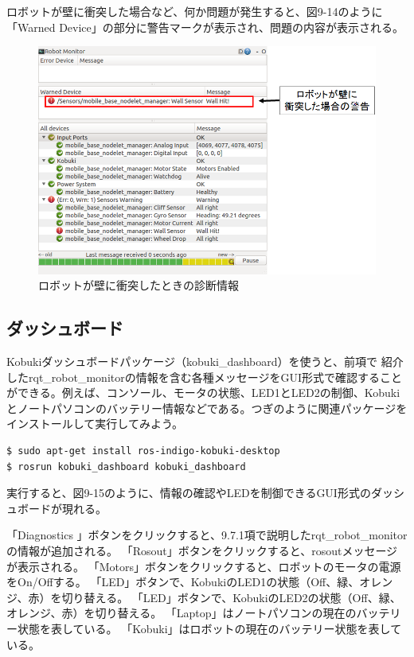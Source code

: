 \begin{itemize}
ロボットが壁に衝突した場合など、何か問題が発生すると、図9-14のように「Warned Device」の部分に警告マークが表示され、問題の内容が表示される。

\begin{figure}[htp]
  \centering
  \includegraphics[width=12cm]{pictures/chapter9/pic_09_14.png}
  \caption{ロボットが壁に衝突したときの診断情報}
\end{figure}

\subsection{ダッシュボード}

Kobukiダッシュボードパッケージ（kobuki\_dashboard）を使うと、前項で   紹介したrqt\_robot\_monitorの情報を含む各種メッセージをGUI形式で確認することができる。例えば、コンソール、モータの状態、LED1とLED2の制御、Kobukiとノートパソコンのバッテリー情報などである。つぎのように関連パッケージをインストールして実行してみよう。

\begin{lstlisting}[language=ROS]
$ sudo apt-get install ros-indigo-kobuki-desktop
$ rosrun kobuki_dashboard kobuki_dashboard
\end{lstlisting}

実行すると、図9-15のように、情報の確認やLEDを制御できるGUI形式のダッシュボードが現れる。

\setcounter{num}{0}
\circled{\thenum} 「Diagnostics   」ボタンをクリックすると、9.7.1項で説明したrqt\_robot\_monitor\\の情報が追加される。
\circled{\thenum}「Rosout」ボタンをクリックすると、rosoutメッセージが表示される。
\circled{\thenum}「Motors」ボタンをクリックすると、ロボットのモータの電源をOn/Offする。
\circled{\thenum}「LED」ボタンで、KobukiのLED1の状態（Off、緑、オレンジ、赤）を切り替える。
\circled{\thenum}「LED」ボタンで、KobukiのLED2の状態（Off、緑、オレンジ、赤）を切り替える。
\circled{\thenum}「Laptop」はノートパソコンの現在のバッテリー状態を表している。
\circled{\thenum}「Kobuki」はロボットの現在のバッテリー状態を表している。


\end{itemize}

